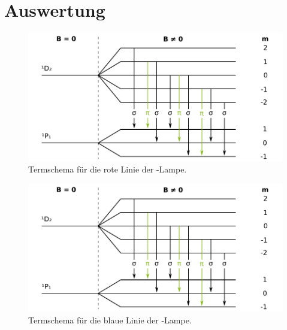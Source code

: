 \newpage
\section{Auswertung}
\label{sec:Auswertung}

\begin{figure}
	\centering
	\includegraphics{images/termschema-rot.pdf}
	\caption{Termschema für die rote Linie der -Lampe.}
	\label{fig:termschema-rot}
\end{figure}

\begin{figure}
	\centering
	\includegraphics{images/termschema-blau.pdf}
	\caption{Termschema für die blaue Linie der -Lampe.}
	\label{fig:termschema-blau}
\end{figure}
